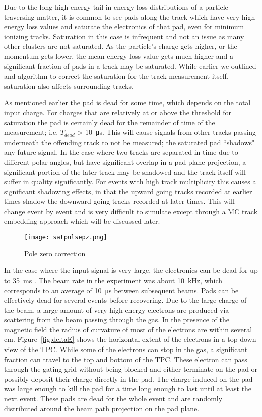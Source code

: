 Due to the long high energy tail in energy loss distributions of a particle traversing matter, it is common to see pads along the track which have very high energy loss values and saturate the electronics of that pad, even for minimum ionizing tracks. Saturation in this case is infrequent and not an issue as many other clusters are not saturated. As the particle's charge gets higher, or the momentum gets lower, the mean energy loss value gets much higher and a significant fraction of pads in a track may be saturated. While earlier we outlined and algorithm to correct the saturation for the track measurement itself, saturation also affects surrounding tracks. 

As mentioned earlier the pad is dead for some time, which depends on the total input charge. For charges that are relatively at or above the threshold for saturation the pad is certainly dead for the remainder of time of the measurement; i.e. $T_{dead}$ > \SI{10}{\micro\second}. This will cause signals from other tracks passing underneath the offending track to not be measured; the saturated pad ``shadows" any future signal. In the case where two tracks are separated in time due to different polar angles, but have significant overlap in a pad-plane projection, a significant portion of the later track may be shadowed and the track itself will suffer in quality significantly. For events with high track multiplicity this causes a significant shadowing effects, in that the upward going tracks recorded at earlier times shadow the downward going tracks recorded at later times. This will change event by event and is very difficult to simulate except through a MC track embedding approach which will be discussed later. 

\begin{figure}[!htb]
\centering
\texttt{[image: satpulsepz.png]} 
\caption{Pole zero correction} 
\label{fig:pulseSatTag}
\end{figure}


In the case where the input signal is very large, the electronics can be dead for up to \SI{35}{\milli\second} \cite{akiGET}. The beam rate in the experiment was about \SI{10}{\kilo\hertz}, which corresponds to an average of \SI{10}{\micro\second} between subsequent beams. Pads can be effectively dead for several events before recovering. Due to the large charge of the beam, a large amount of very high energy electrons are produced via scattering from the beam passing through the gas. In the presence of the magnetic field the radius of curvature of most of the electrons are within several \si{cm}. Figure~\ref{fig:deltaE} shows the horizontal extent of the electrons in a top down view of the TPC. While some of the electrons can stop in the gas, a significant fraction can travel to the top and bottom of the TPC. These electron can pass through the gating grid without being blocked and either terminate on the pad or possibly deposit their charge directly in the pad. The charge induced on the pad was large enough to kill the pad for a time long enough to last until at least the next event. These pads are dead for the whole event and are randomly distributed around the beam path projection on the pad plane. 


